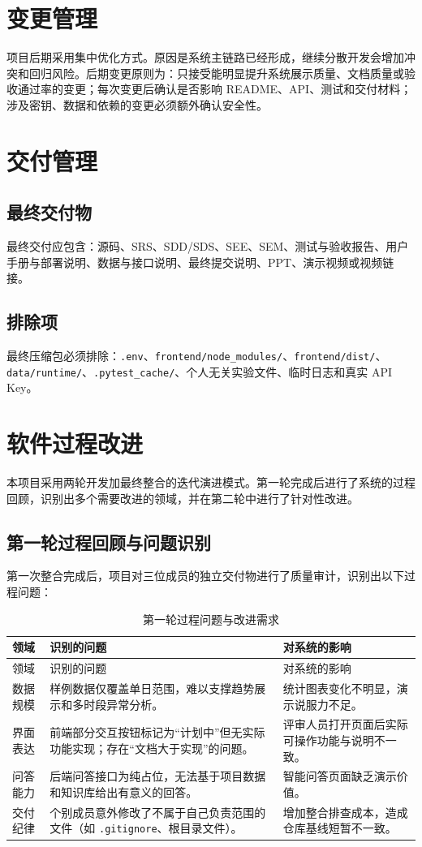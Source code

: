 \documentclass[12pt,a4paper]{ctexart}
\newcommand{\code}[1]{{\footnotesize\nolinkurl{#1}}}
\begin{document}
\section{变更管理}
项目后期采用集中优化方式。原因是系统主链路已经形成，继续分散开发会增加冲突和回归风险。后期变更原则为：只接受能明显提升系统展示质量、文档质量或验收通过率的变更；每次变更后确认是否影响 README、API、测试和交付材料；涉及密钥、数据和依赖的变更必须额外确认安全性。

\section{交付管理}
\subsection{最终交付物}
最终交付应包含：源码、SRS、SDD/SDS、SEE、SEM、测试与验收报告、用户手册与部署说明、数据与接口说明、最终提交说明、PPT、演示视频或视频链接。

\subsection{排除项}
最终压缩包必须排除：\code{.env}、\code{frontend/node_modules/}、\code{frontend/dist/}、\code{data/runtime/}、\code{.pytest_cache/}、个人无关实验文件、临时日志和真实 API Key。

\section{软件过程改进}

本项目采用两轮开发加最终整合的迭代演进模式。第一轮完成后进行了系统的过程回顾，识别出多个需要改进的领域，并在第二轮中进行了针对性改进。

\subsection{第一轮过程回顾与问题识别}

第一次整合完成后，项目对三位成员的独立交付物进行了质量审计，识别出以下过程问题：

\begin{longtable}{L{2.8cm}L{4.2cm}L{6.8cm}}
\caption{第一轮过程问题与改进需求}\\
\toprule
领域 & 识别的问题 & 对系统的影响 \\
\midrule
\endfirsthead
\toprule
领域 & 识别的问题 & 对系统的影响 \\
\midrule
\endhead
数据规模 & 样例数据仅覆盖单日范围，难以支撑趋势展示和多时段异常分析。 & 统计图表变化不明显，演示说服力不足。 \\
界面表达 & 前端部分交互按钮标记为“计划中”但无实际功能实现；存在“文档大于实现”的问题。 & 评审人员打开页面后实际可操作功能与说明不一致。 \\
问答能力 & 后端问答接口为纯占位，无法基于项目数据和知识库给出有意义的回答。 & 智能问答页面缺乏演示价值。 \\
交付纪律 & 个别成员意外修改了不属于自己负责范围的文件（如 \code{.gitignore}、根目录文件）。 & 增加整合排查成本，造成仓库基线短暂不一致。 \\
\bottomrule
\end{longtable}
\end{document}
